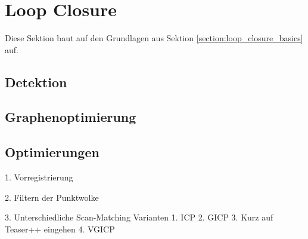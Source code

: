 \chapter{Loop Closure}
\label{chapter:loop_closure}

Diese Sektion baut auf den Grundlagen aus Sektion \ref{section:loop_closure_basics} auf.

\section{Detektion}

\section{Graphenoptimierung}

\section{Optimierungen}

1. Vorregistrierung

2. Filtern der Punktwolke

3. Unterschiedliche Scan-Matching Varianten
	1. ICP
	2. GICP
	3. Kurz auf Teaser++ eingehen
	4. VGICP

